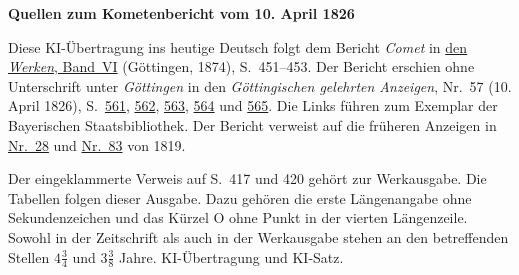 \clearpage\thispagestyle{empty}
\begin{center}\textbf{Quellen zum Kometenbericht vom 10. April 1826}\end{center}
\noindent Diese KI-Übertragung ins heutige Deutsch folgt dem Bericht \textit{Comet} in \href{https://gdz.sub.uni-goettingen.de/id/PPN236007467}{den \textit{Werken}, Band~VI} (Göttingen, 1874), S.~451--453. Der Bericht erschien ohne Unterschrift unter \textit{Göttingen} in den \textit{Göttingischen gelehrten Anzeigen}, Nr.~57 (10. April 1826), S.~\href{https://api.digitale-sammlungen.de/iiif/image/v2/bsb10538703_00567/full/1550,/0/default.jpg}{561}, \href{https://api.digitale-sammlungen.de/iiif/image/v2/bsb10538703_00568/full/1550,/0/default.jpg}{562}, \href{https://api.digitale-sammlungen.de/iiif/image/v2/bsb10538703_00569/full/1550,/0/default.jpg}{563}, \href{https://api.digitale-sammlungen.de/iiif/image/v2/bsb10538703_00570/full/1550,/0/default.jpg}{564} und \href{https://api.digitale-sammlungen.de/iiif/image/v2/bsb10538703_00571/full/1550,/0/default.jpg}{565}. Die Links führen zum Exemplar der Bayerischen Staatsbibliothek. Der Bericht verweist auf die früheren Anzeigen in \hyperlink{native-422}{Nr.~28} und \hyperlink{native-425}{Nr.~83} von 1819.
\par\smallskip\noindent Der eingeklammerte Verweis auf S.~417 und 420 gehört zur Werkausgabe. Die Tabellen folgen dieser Ausgabe. Dazu gehören die erste Längenangabe ohne Sekundenzeichen und das Kürzel O ohne Punkt in der vierten Längenzeile. Sowohl in der Zeitschrift als auch in der Werkausgabe stehen an den betreffenden Stellen $4\frac{3}{4}$ und $3\frac{3}{8}$ Jahre. KI-Übertragung und KI-Satz.
\clearpage
